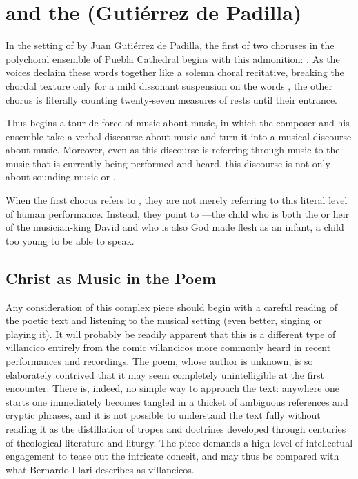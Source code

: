 
\section{ and the 
(Gutiérrez de Padilla)}

In the setting of  by Juan Gutiérrez de
Padilla, the first of two choruses in the polychoral ensemble of Puebla
Cathedral begins with this admonition: 
.
As the voices declaim these words together like a solemn choral recitative, 
breaking the chordal texture only for a mild dissonant suspension on the words
, the other chorus is literally counting
twenty-seven measures of rests until their entrance.

Thus begins a tour-de-force of music about music, in which the composer and his
ensemble take a verbal discourse about music and turn it into a musical
discourse about music.
Moreover, even as this discourse is referring through music to the music that is
currently being performed and heard, this discourse is not only about sounding
music or .

When the first chorus refers to , they are not merely
referring to this literal level of human performance.
Instead, they point to ---the child who is both
the  or heir of the musician-king David and who is also God made
flesh as an infant, a child too young to be able to speak.

\subsection{Christ as Music in the Poem}

Any consideration of this complex piece should begin with a careful reading of
the poetic text and listening to the musical setting (even better, singing or playing it).%
    \autocite[\XXX]{Cashner:WLSCM-VCs}
It will probably be readily apparent that this is a different type of
villancico entirely from the comic villancicos more commonly heard in recent
performances and recordings.
The poem, whose author is unknown, is so elaborately contrived that it may seem
completely unintelligible at the first encounter. 
There is, indeed, no simple way to approach the text: anywhere one starts one
immediately becomes tangled in a thicket of ambiguous references and cryptic
phrases, and it is not possible to understand the text fully without reading it
as the distillation of tropes and doctrines developed through centuries of
theological literature and liturgy.
The piece demands a high level of intellectual engagement to tease out the
intricate conceit, and may thus be compared with what Bernardo Illari describes
as  villancicos.%
    \Autocite[vol.\ 2, 304--308]{Illari:Polychoral}

